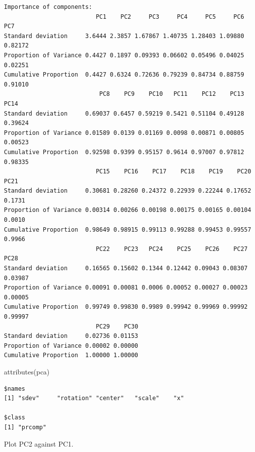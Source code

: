 \documentclass[
  letterpaper,
  DIV=11,
  numbers=noendperiod]{scrartcl}
\newenvironment{Shaded}{\begin{snugshade}}{\end{snugshade}}
\newcommand{\AttributeTok}[1]{\textcolor[rgb]{0.40,0.45,0.13}{#1}}
\newcommand{\DecValTok}[1]{\textcolor[rgb]{0.68,0.00,0.00}{#1}}
\newcommand{\FunctionTok}[1]{\textcolor[rgb]{0.28,0.35,0.67}{#1}}
\newcommand{\NormalTok}[1]{\textcolor[rgb]{0.00,0.23,0.31}{#1}}
\newcommand{\SpecialCharTok}[1]{\textcolor[rgb]{0.37,0.37,0.37}{#1}}
\begin{document}
\begin{verbatim}
Importance of components:
                          PC1    PC2     PC3     PC4     PC5     PC6     PC7
Standard deviation     3.6444 2.3857 1.67867 1.40735 1.28403 1.09880 0.82172
Proportion of Variance 0.4427 0.1897 0.09393 0.06602 0.05496 0.04025 0.02251
Cumulative Proportion  0.4427 0.6324 0.72636 0.79239 0.84734 0.88759 0.91010
                           PC8    PC9    PC10   PC11    PC12    PC13    PC14
Standard deviation     0.69037 0.6457 0.59219 0.5421 0.51104 0.49128 0.39624
Proportion of Variance 0.01589 0.0139 0.01169 0.0098 0.00871 0.00805 0.00523
Cumulative Proportion  0.92598 0.9399 0.95157 0.9614 0.97007 0.97812 0.98335
                          PC15    PC16    PC17    PC18    PC19    PC20   PC21
Standard deviation     0.30681 0.28260 0.24372 0.22939 0.22244 0.17652 0.1731
Proportion of Variance 0.00314 0.00266 0.00198 0.00175 0.00165 0.00104 0.0010
Cumulative Proportion  0.98649 0.98915 0.99113 0.99288 0.99453 0.99557 0.9966
                          PC22    PC23   PC24    PC25    PC26    PC27    PC28
Standard deviation     0.16565 0.15602 0.1344 0.12442 0.09043 0.08307 0.03987
Proportion of Variance 0.00091 0.00081 0.0006 0.00052 0.00027 0.00023 0.00005
Cumulative Proportion  0.99749 0.99830 0.9989 0.99942 0.99969 0.99992 0.99997
                          PC29    PC30
Standard deviation     0.02736 0.01153
Proportion of Variance 0.00002 0.00000
Cumulative Proportion  1.00000 1.00000
\end{verbatim}

\begin{Shaded}
\begin{Highlighting}[]
\FunctionTok{attributes}\NormalTok{(pca)}
\end{Highlighting}
\end{Shaded}

\begin{verbatim}
$names
[1] "sdev"     "rotation" "center"   "scale"    "x"       

$class
[1] "prcomp"
\end{verbatim}

Plot PC2 against PC1.

\begin{Shaded}
\end{Shaded}
\end{document}
